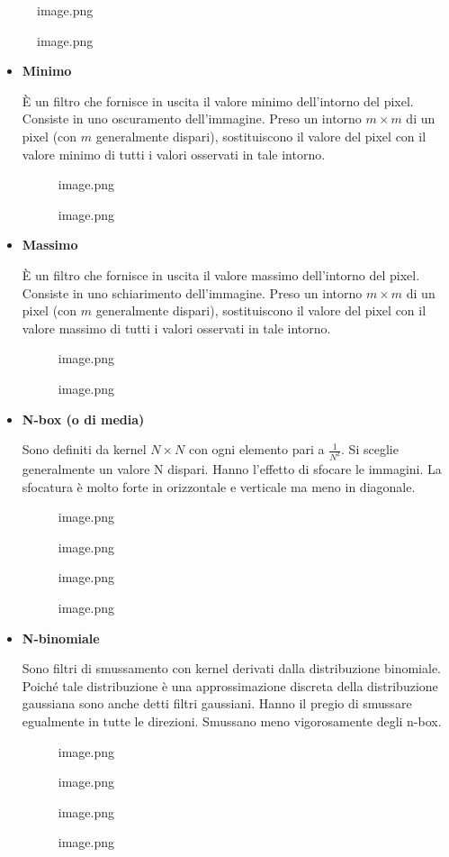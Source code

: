 \documentclass[
]{article}
\begin{document}
\begin{figure}
\centering
{image.png}
\caption{image.png}
\end{figure}

\begin{itemize}
\item
  \textbf{Minimo}

  È un filtro che fornisce in uscita il valore minimo dell'intorno del pixel. Consiste in uno oscuramento dell'immagine. Preso un intorno \(m\times m\) di un pixel (con \(m\) generalmente dispari), sostituiscono il valore del pixel con il valore minimo di tutti i valori osservati in tale intorno.

  \begin{figure}
  \centering
  {image.png}
  \caption{image.png}
  \end{figure}
\item
  \textbf{Massimo}

  È un filtro che fornisce in uscita il valore massimo dell'intorno del pixel. Consiste in uno schiarimento dell'immagine. Preso un intorno \(m \times m\) di un pixel (con \(m\) generalmente dispari), sostituiscono il valore del pixel con il valore massimo di tutti i valori osservati in tale intorno.

  \begin{figure}
  \centering
  {image.png}
  \caption{image.png}
  \end{figure}
\item
  \textbf{N-box (o di media)}

  Sono definiti da kernel \(N \times N\) con ogni elemento pari a \(\frac{1}{N^2}\). Si sceglie generalmente un valore N dispari. Hanno l'effetto di sfocare le immagini. La sfocatura è molto forte in orizzontale e verticale ma meno in diagonale.

  \begin{figure}
  \centering
  {image.png}
  \caption{image.png}
  \end{figure}

  \begin{figure}
  \centering
  {image.png}
  \caption{image.png}
  \end{figure}
\item
  \textbf{N-binomiale}

  Sono filtri di smussamento con kernel derivati dalla distribuzione binomiale. Poiché tale distribuzione è una approssimazione discreta della distribuzione gaussiana sono anche detti filtri
  gaussiani. Hanno il pregio di smussare egualmente in tutte le direzioni. Smussano meno vigorosamente degli n-box.

  \begin{figure}
  \centering
  {image.png}
  \caption{image.png}
  \end{figure}

  \begin{figure}
  \centering
  {image.png}
  \caption{image.png}
  \end{figure}
\end{itemize}
\end{document}
